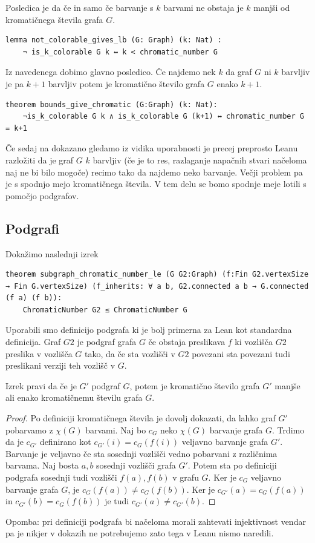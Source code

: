 \documentclass[mat1]{fmfdelo}
\begin{document}
Posledica je da če in samo če barvanje s $k$ barvami ne obstaja je $k$ manjši od kromatičnega števila grafa $G$.
\begin{lstlisting}
lemma not_colorable_gives_lb (G: Graph) (k: Nat) :
    ¬ is_k_colorable G k ↔ k < chromatic_number G
\end{lstlisting}

Iz navedenega dobimo glavno posledico.
Če najdemo nek $k$ da graf $G$ ni $k$ barvljiv je pa $k+1$ barvljiv potem je kromatično število grafa $G$ enako $k+1$.
\begin{lstlisting}
theorem bounds_give_chromatic (G:Graph) (k: Nat):
    ¬is_k_colorable G k ∧ is_k_colorable G (k+1) ↔ chromatic_number G = k+1
\end{lstlisting}

Če sedaj na dokazano gledamo iz vidika uporabnosti je precej preprosto Leanu razložiti da je graf $G$ $k$ barvljiv
(če je to res, razlaganje napačnih stvari načeloma naj ne bi bilo mogoče) recimo tako da najdemo neko barvanje. Večji problem pa je
s spodnjo mejo kromatičnega števila. 
V tem delu se bomo spodnje meje lotili s pomočjo podgrafov.


\subsection{Podgrafi}
Dokažimo naslednji izrek
\begin{lstlisting}
theorem subgraph_chromatic_number_le (G G2:Graph) (f:Fin G2.vertexSize → Fin G.vertexSize) (f_inherits: ∀ a b, G2.connected a b → G.connected (f a) (f b)):
    ChromaticNumber G2 ≤ ChromaticNumber G
\end{lstlisting}
Uporabili smo definicijo podgrafa ki je bolj primerna za Lean kot standardna definicija.
Graf $G2$ je podgraf grafa $G$ če obstaja preslikava $f$ ki vozlišča $G2$ preslika v vozlišča $G$ tako, 
da če sta vozlišči v $G2$ povezani sta povezani tudi preslikani verziji teh vozlišč v $G$.

Izrek pravi da če je $G'$ podgraf $G$, potem je kromatično število grafa $G'$ manjše ali enako kromatičnemu številu grafa $G$.
\begin{proof}
Po definiciji kromatičnega števila je dovolj dokazati, da lahko graf $G'$ pobarvamo z $\chi(G)$ barvami. Naj bo $c_G$ 
neko $\chi(G)$ barvanje grafa $G$. Trdimo da je $c_{G'}$ definirano kot $c_{G'}(i) = c_G(f(i))$ veljavno barvanje grafa $G'$. 
Barvanje je veljavno če sta sosednji vozlišči vedno pobarvani z različnima barvama. Naj bosta $a, b$ sosednji vozlišči grafa $G'$.
Potem sta po definiciji podgrafa sosednji tudi vozlišči $f(a), f(b)$ v grafu $G$. Ker je $c_G$ veljavno barvanje grafa $G$, je 
$c_G(f(a))\neq c_G(f(b))$. Ker je $c_{G'}(a) = c_G(f(a))$ in $c_{G'}(b) = c_G(f(b))$ je tudi $c_{G'}(a)\neq c_{G'}(b)$.
\end{proof}
Opomba: pri definiciji podgrafa bi načeloma morali zahtevati injektivnost vendar pa je nikjer v dokazih ne potrebujemo zato
tega v Leanu nismo naredili. 
\end{document}
